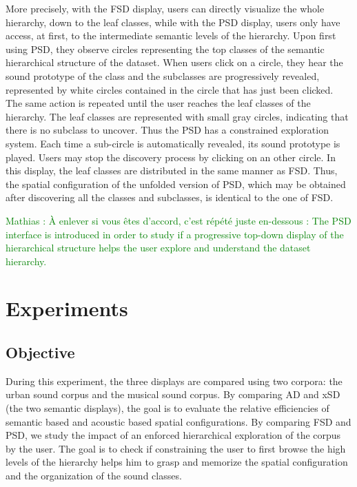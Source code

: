 \documentclass{aes2e}
\newcommand{\mr}[1]{\textcolor{green}{Mathias : #1}}
\begin{document}
More precisely, with the FSD display, users can directly visualize the whole hierarchy, down to the leaf classes, while with the PSD display, users only have access, at first, to the intermediate semantic levels of the hierarchy. Upon first using PSD, they observe circles representing the top classes of the semantic hierarchical structure of the dataset. When users click on a circle, they hear the sound prototype of the class and the subclasses are progressively revealed, represented by white circles contained in the circle that has just been clicked. The same action is repeated until the user reaches the leaf classes of the hierarchy. The leaf classes are represented with small gray circles, indicating that there is no subclass to uncover. Thus the PSD has a constrained exploration system. Each time a sub-circle is automatically revealed, its sound prototype is played. Users may stop the discovery process by clicking on an other circle. In this display, the leaf classes are distributed  in the same manner as FSD. Thus, the spatial configuration of the unfolded version of PSD, which may be obtained after discovering all the classes and subclasses, is identical to the one of FSD.

\mr{À enlever si vous êtes d'accord, c'est répété juste en-dessous : The PSD interface is introduced in order to study if a progressive top-down display of the hierarchical structure helps the user explore and understand the dataset hierarchy.}

\section{Experiments} \label{test}

\subsection{Objective}

During this experiment, the three displays are compared using two corpora: the urban sound corpus and the musical sound corpus. By comparing AD and xSD (the two semantic displays), the goal is to evaluate the  relative efficiencies of semantic based and acoustic based spatial configurations. By comparing FSD and PSD, we study the impact of an enforced hierarchical exploration of the corpus by the user. The goal is to check if constraining the user to first browse the high levels of the hierarchy helps him to grasp and memorize the spatial configuration and the organization of the sound classes. 
\end{document}
